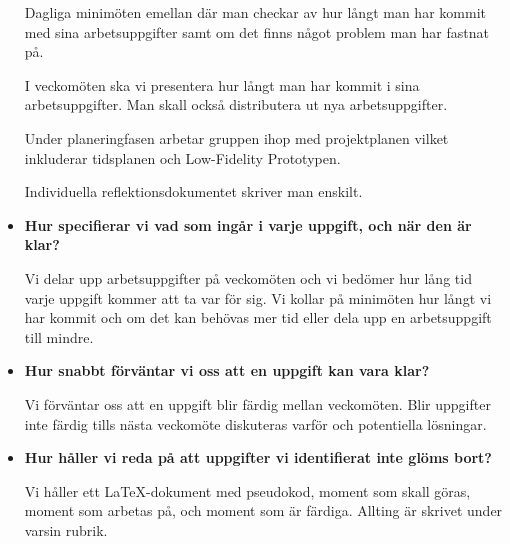 \documentclass{mall}
\begin{document}
\begin{itemize}
  Dagliga minimöten emellan där man checkar av hur långt man har kommit med sina arbetsuppgifter samt om det finns något problem man har fastnat på.
  
  I veckomöten ska vi presentera hur långt man har kommit i sina arbetsuppgifter. Man skall också distributera ut nya arbetsuppgifter.

  Under planeringfasen arbetar gruppen ihop med projektplanen vilket inkluderar tidsplanen och Low-Fidelity Prototypen.
  
  Individuella reflektionsdokumentet skriver man enskilt.

\item \textbf{Hur specifierar vi vad som ingår i varje uppgift, och när den är klar?}

  Vi delar upp arbetsuppgifter på veckomöten och vi bedömer hur lång tid varje uppgift kommer att ta var för sig. Vi kollar på minimöten hur långt vi har kommit och om det kan behövas mer tid eller dela upp en arbetsuppgift till mindre.

\item \textbf{Hur snabbt förväntar vi oss att en uppgift kan vara klar?}

  Vi förväntar oss att en uppgift blir färdig mellan veckomöten. Blir uppgifter inte färdig tills nästa veckomöte diskuteras varför och potentiella lösningar.

\item \textbf{Hur håller vi reda på att uppgifter vi identifierat inte glöms bort?}

  Vi håller ett LaTeX-dokument med pseudokod, moment som skall göras, moment som arbetas på, och moment som är färdiga. Allting är skrivet under varsin rubrik.

\end{itemize}
\end{document}
